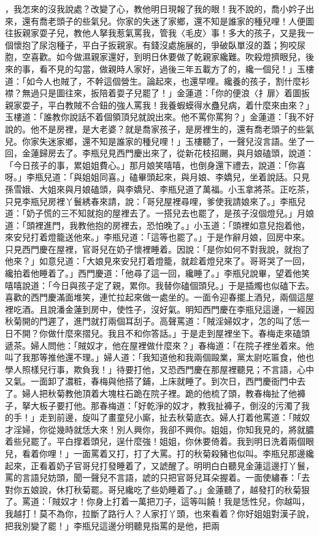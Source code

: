 ，我怎來的沒我說處？改變了心，教他明日現報了我的眼！我不說的，喬小妗子出來，還有喬老頭子的些氣兒。你家的失迷了家鄉，還不知是誰家的種兒哩！人便圖往扳親家耍子兒，教他人拏我惹氣罵我，管我〈毛皮〉事！多大的孩子，又是我一個懷抱了尿泡種子，平白子扳親家。有錢沒處施展的，爭破臥單沒的蓋；狗咬尿胞，空喜歡。如今做濕親家還好，到明日休要做了乾親家纔難。吹殺燈擠眼兒，後來的事，看不見的勾當，做親時人家好，過後三年五載方了的，纔一個兒！」玉樓道：「如今人也賊了，不幹這個營生。論起來，也還早哩。纔養的孩子，割什麼衫襟？無過只是圖往來，扳陪着耍子兒罷了！」金蓮道：「你的便浪〈扌扉〉着圖扳親家耍子，平白教賊不合鈕的強人罵我！我養蝦蟆得水蠱兒病，着什麼來由來？」玉樓道：「誰教你說話不着個領頂兒就說出來。他不罵你罵狗？」金蓮道：「我不好說的。他不是房裡，是大老婆？就是喬家孩子，是房裡生的，還有喬老頭子的些氣兒。你家失迷家鄉，還不知是誰家的種兒哩！」玉樓聽了，一聲兒沒言語。坐了一回，金蓮歸房去了。李瓶兒見西門慶出來了，從新花枝招颺，與月娘磕頭，說道：「今日孩子的事，累姐姐費心。」那月娘笑嘻嘻，也倒身還下禮去，說道：「你喜呀。」李瓶兒道：「與姐姐同喜。」磕畢頭起來，與月娘、李嬌兒，坐着說話。只見孫雪娥、大姐來與月娘磕頭，與李嬌兒、李瓶兒道了萬福。小玉拿將茶。正吃茶，只見李瓶兒房裡丫鬟綉春來請，說：「哥兒屋裡尋哩，爹使我請娘來了。」李瓶兒道：「奶子慌的三不知就抱的屋裡去了。一搭兒去也罷了，是孩子沒個燈兒。」月娘道：「頭裡進門，我教他抱的房裡去，恐怕晚了。」小玉道：「頭裡如意兒抱着他，來安兒打着燈籠送他來。」李瓶兒道：「這等也罷了。」于是作辭月娘，回房中來。只見西門慶在屋裡，官哥兒在奶子懷裡睡着。因說：「是你如何不對我說，就抱了他來？」如意兒道：「大娘見來安兒打着燈籠，就趁着燈兒來了。哥哥哭了一回，纔拍着他睡着了。」西門慶道：「他尋了這一回，纔睡了。」李瓶兒說畢，望着他笑嘻嘻說道：「今日與孩子定了親，累你。我替你磕個頭兒。」于是插燭也似磕下去。喜歡的西門慶滿面堆笑，連忙拉起來做一處坐的。一面令迎春擺上酒兒，兩個這屋裡吃酒。且說潘金蓮到房中，使性子，沒好氣。明知西門慶在李瓶兒這邊，一經因秋菊開的門遲了，進門就打兩個耳刮子。高聲罵道：「賊淫婦奴才，怎的叫了恁一日不開？你做什麼來摺兒。我且不和你答話。」于是走到屋裡坐下。春梅走來磕頭遞茶。婦人問他：「賊奴才，他在屋裡做什麼來？」春梅道：「在院子裡坐着來。他叫了我那等推他還不理。」婦人道：「我知道他和我兩個毆業，黨太尉吃匾食，他也學人照樣兒行事，欺負我！」待要打他，又恐西門慶在那屋裡聽見；不言語，心中又氣。一面卸了濃粧，春梅與他搭了鋪，上床就睡了。到次日，西門慶衙門中去了。婦人把秋菊教他頂着大塊柱石跪在院子裡。跪的他梳了頭，教春梅扯了他褲子，拏大板子要打他。那春梅道：「好乾淨的奴才，教我扯褲子，倒沒的污濁了我的手！」走到前邊，旋叫了畫童兒小廝，扯去秋菊底衣。婦人打着他罵道：「賊奴才淫婦，你從幾時就恁大來！別人興你，我卻不興你。姐姐，你知我見的，將就膿着些兒罷了。平白撑着頭兒，逞什麼強！姐姐，你休要倚着。我到明日洗着兩個眼兒，看着你哩！」一面罵着又打，打了大罵。打的秋菊殺豬也似叫。李瓶兒那邊纔起來，正看着奶子官哥兒打發睡着了，又諕醒了。明明白白聽見金蓮這邊打丫鬟，罵的言語兒妨頭，聞一聲兒不言語，諕的只把官哥兒耳朵握着。一面使繡春：「去對你五娘說，休打秋菊罷。哥兒纔吃了些奶睡着了。」金蓮聽了，越發打的秋菊狠了。罵道：「賊奴才！你身上打着一萬把刀子，這等叫饒！我是恁性兒，你越叫，我越打！莫不為你，拉斷了路行人？人家打丫頭，也來看着？你好姐姐對漢子說，把我別變了罷！」李瓶兒這邊分明聽見指罵的是他，把兩